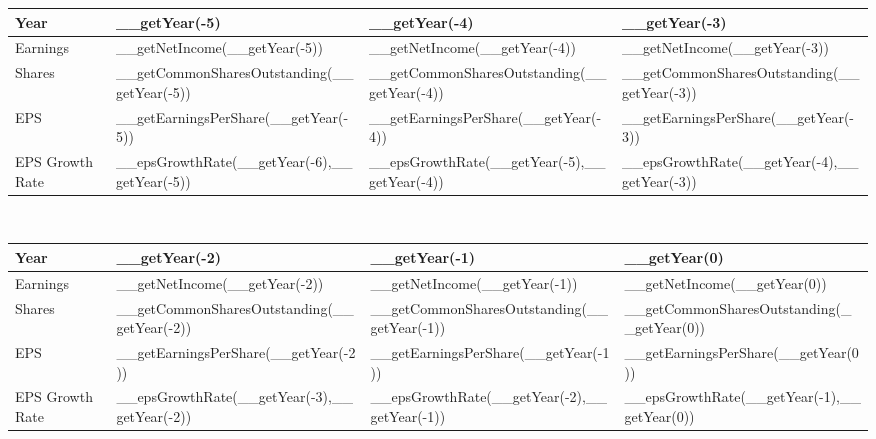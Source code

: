 \begin{tabularx}{\textwidth}{|X|X|X|X|}
 \hline
 Year                                 & __getYear(-5)                                 & __getYear(-4)                                 & __getYear(-3)                                 \\
 \hline
 Earnings                             & __getNetIncome(__getYear(-5))                 & __getNetIncome(__getYear(-4))                 & __getNetIncome(__getYear(-3))                 \\
 Shares                               & __getCommonSharesOutstanding(__getYear(-5))   & __getCommonSharesOutstanding(__getYear(-4))   & __getCommonSharesOutstanding(__getYear(-3))   \\
 EPS                                  & __getEarningsPerShare(__getYear(-5))          & __getEarningsPerShare(__getYear(-4))          & __getEarningsPerShare(__getYear(-3))          \\
 \rowcolor{lightgray} EPS Growth Rate & __epsGrowthRate(__getYear(-6),__getYear(-5))  & __epsGrowthRate(__getYear(-5),__getYear(-4))  & __epsGrowthRate(__getYear(-4),__getYear(-3))  \\
 \hline
\end{tabularx}\\

\begin{tabularx}{\textwidth}{|X|X|X|X|}
 \hline
 Year                                 & __getYear(-2)                                 & __getYear(-1)                                 & __getYear(0)                                 \\
 \hline
 Earnings                             & __getNetIncome(__getYear(-2))                 & __getNetIncome(__getYear(-1))                 & __getNetIncome(__getYear(0))                 \\
 Shares                               & __getCommonSharesOutstanding(__getYear(-2))   & __getCommonSharesOutstanding(__getYear(-1))   & __getCommonSharesOutstanding(__getYear(0))   \\
 EPS                                  & __getEarningsPerShare(__getYear(-2))          & __getEarningsPerShare(__getYear(-1))          & __getEarningsPerShare(__getYear(0))          \\
 \rowcolor{lightgray} EPS Growth Rate & __epsGrowthRate(__getYear(-3),__getYear(-2))  & __epsGrowthRate(__getYear(-2),__getYear(-1))  & __epsGrowthRate(__getYear(-1),__getYear(0))  \\
 \hline
\end{tabularx}\\

